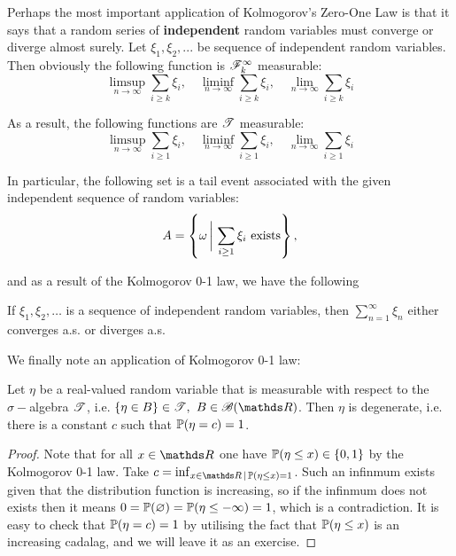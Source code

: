 Perhaps the most important application of Kolmogorov's Zero-One Law is that it says that a random series of \textbf{independent} random variables must converge or diverge almost surely. Let $\xi_1, \xi_2, ...$ be sequence of independent random variables. Then obviously the following function is $\mathcal{F}_k^\infty$ measurable:
\begin{equation*}
    \limsup_{n\to\infty} \sum_{i\geq k} \xi_i, \quad \liminf_{n\to\infty} \sum_{i\geq k} \xi_i, \quad \lim_{n\to\infty} \sum_{i\geq k} \xi_i
\end{equation*}

As a result, the following functions are $\mathcal{T}$ measurable:
\begin{equation*}
    \limsup_{n\to\infty} \sum_{i\geq 1} \xi_i, \quad \liminf_{n\to\infty} \sum_{i\geq 1} \xi_i, \quad \lim_{n\to\infty} \sum_{i\geq 1} \xi_i
\end{equation*}

In particular, the following set is a tail event associated with the given independent sequence of random variables:
\begin{equation*}
A = \left\{ \omega \, \bigg| \, \sum_{i\geq 1} \xi_i \text{ exists} \right \},
\end{equation*}

and as a result of the Kolmogorov 0-1 law, we have the following 
\begin{corollary}
If $\xi_1, \xi_2, \dots$ is a sequence of independent random variables, then $\sum_{n=1}^\infty \xi_n$ either converges a.s. or diverges a.s.
\end{corollary}

We finally note an application of Kolmogorov 0-1 law:
\begin{example}
Let $\eta$ be a real-valued random variable that is measurable with respect to the $\sigma-$algebra $\mathcal{T}$, i.e. $\{ \eta \in B\} \in \mathcal{T},$ $B \in \B(\R)$. Then $\eta$ is degenerate, i.e. there is a constant $c$ such that $\mathbb{P}(\eta = c) = 1$.
\end{example}

\begin{proof}
Note that for all $x \in \R$ one have $\mathbb{P}(\eta \leq x) \in \left\{ 0,1 \right \}$ by the Kolmogorov 0-1 law. Take $c = \inf_{x \in \R \,|\, \p(\eta \leq x) = 1}$. Such an infinmum exists given that the distribution function is increasing, so if the infinmum does not exists then it means $0 = \mathbb{P}(\varnothing) = \mathbb{P}(\eta \leq -\infty) = 1$, which is a contradiction. It is easy to check that $\mathbb{P}(\eta = c) = 1$ by utilising the fact that $\mathbb{P}(\eta \leq x)$ is an increasing cadalag, and we will leave it as an exercise.
\end{proof}

